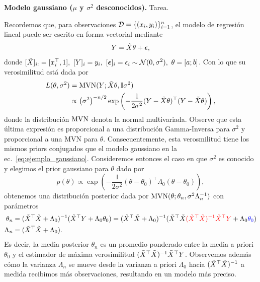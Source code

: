 \textbf{Modelo gaussiano ($\mu$ y $\sigma^2$ desconocidos).} Tarea. 

\begin{mdframed}[style=ejemplo, frametitle={\center Ejemplo: Distribución posterior modelo lineal y gaussiano}]
Recordemos que, para observaciones ${\mathcal D}=\{(x_i,y_i)\}_{i=1}^n$, el modelo de regresión lineal puede ser escrito en forma vectorial mediante
\begin{equation}
 	Y = \tilde{X}\theta + {\bm \epsilon},
 \end{equation}
 donde $[\tX]_{i:} = [x_i^\top,1],\ [Y]_i = y_i,\ [\bepsilon]_i = \epsilon_i\sim\cN(0,\sigma^2),\ \theta = [a;b]$. Con lo que su verosimilitud está dada por 
\begin{align}
	L(\theta,\sigma^2) &= \operatorname{\text{MVN}}(Y; \tilde{X}\theta, {\mathbb I}\sigma^2)\\
					&\propto \left(\sigma^2\right)^{-n/2}   \exp\left(-\frac{1}{2\sigma^2} (Y - \tilde{X}\theta)^\top(Y - \tilde{X}\theta)\right),\nonumber
\end{align}
donde la distribución $\operatorname{\text{MVN}}$ denota la normal multivariada. Observe que esta última  expresión es proporcional a una distribución Gamma-Inversa para $\sigma^2$ y proporcional a una MVN para $\theta$. Consecuentemente, esta verosmilitud tiene los mismos priors conjugados que el modelo gaussiano en la ec.~\eqref{eq:ejemplo_gaussiano}. Consideremos entonces el caso en que $\sigma^2$ es conocido y elegimos el prior gaussiano para $\theta$ dado por
\begin{equation}
	p(\theta) \propto \exp\left(-\frac{1}{2\sigma^2}(\theta-\theta_0)^\top\Lambda_0(\theta-\theta_0)\right), 
\end{equation}
obtenemos una distribución posterior dada por $\operatorname{\text{MVN}}(\theta; \theta_n,\sigma^2\Lambda_n^{-1})$ con parámetros 
\begin{align}
	\theta_n &= (\tilde{X}^\top \tilde{X} + \Lambda_0)^{-1} (\tilde{X}^\top  Y + \Lambda_0\theta_0) = (\tilde{X}^\top \tilde{X} + \Lambda_0)^{-1} (\tilde{X}^\top \tilde{X} \textcolor{red}{(\tilde{X}^\top \tilde{X})^{-1}\tilde{X}^\top  Y} + \Lambda_0\textcolor{blue}{\theta_0})\label{eq:mean_post_lin_g}\\
	\Lambda_n &= (\tilde{X}^\top \tilde{X} + \Lambda_0). \label{eq:var_post_lin_g}
\end{align}
Es decir, la media posterior $\theta_n$ es un promedio ponderado entre la media a priori $\theta_0$ y el estimador de máxima verosimilitud $(\tilde{X}^\top \tilde{X})^{-1}\tilde{X}^\top  Y$. Observemos además cómo la varianza $\Lambda_n$ se mueve desde la varianza a priori $\Lambda_0$ hacia $(\tilde{X}^\top \tilde{X})^{-1}$ a medida recibimos más observaciones, resultando en un modelo más preciso. 


\end{mdframed}

